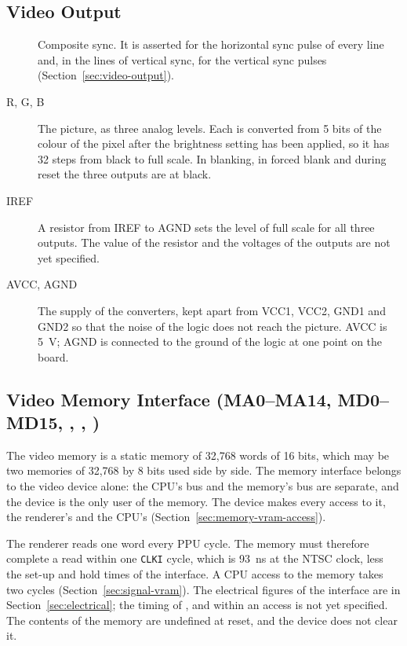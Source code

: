 \subsection{Video Output}

\begin{description}
	\item[] Composite sync. It is asserted for the horizontal sync pulse of every line and, in the lines of
	      vertical sync, for the vertical sync pulses (Section~\ref{sec:video-output}).
	\item[R, G, B] The picture, as three analog levels. Each is converted from 5 bits of the colour of the pixel after the
	      brightness setting has been applied, so it has 32 steps from black to full scale. In blanking, in forced blank and
	      during reset the three outputs are at black.
	\item[IREF] A resistor from IREF to AGND sets the level of full scale for all three outputs. The value of the resistor and
	      the voltages of the outputs are not yet specified.
	\item[AVCC, AGND] The supply of the converters, kept apart from VCC1, VCC2, GND1 and GND2 so that the noise of the logic does
	      not reach the picture. AVCC is 5~V; AGND is connected to the ground of the logic at one point on the board.
\end{description}

\subsection{Video Memory Interface (MA0--MA14, MD0--MD15, , , )}
\label{sec:memory-interface}

The video memory is a static memory of 32,768 words of 16 bits, which may be two memories of 32,768 by 8 bits used side
by side. The memory interface belongs to the video device alone: the CPU's bus and the memory's bus are separate, and
the device is the only user of the memory. The device makes every access to it, the renderer's and the CPU's
(Section~\ref{sec:memory-vram-access}).

The renderer reads one word every PPU cycle. The memory must therefore complete a read within one \texttt{CLKI} cycle,
which is 93~ns at the NTSC clock, less the set-up and hold times of the interface. A CPU access to the memory takes two
cycles (Section~\ref{sec:signal-vram}). The electrical figures of the interface are in Section~\ref{sec:electrical};
the timing of ,  and  within an access is not yet specified. The contents
of the memory are undefined at reset, and the device does not clear it.

